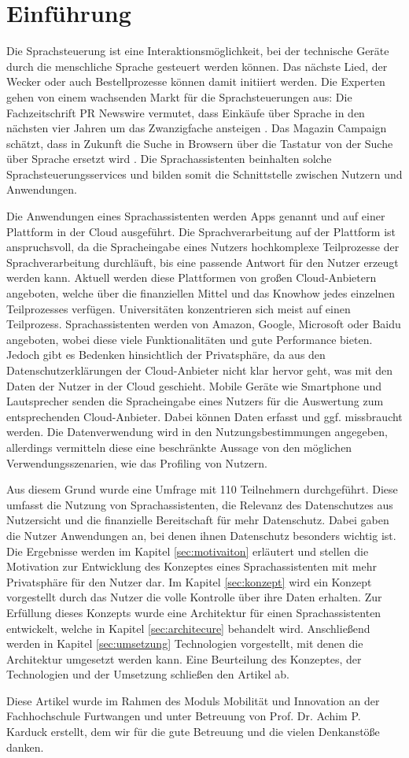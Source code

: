 \section{Einführung}
Die Sprachsteuerung ist eine Interaktionsmöglichkeit, bei der technische Geräte durch die menschliche Sprache gesteuert werden können. Das nächste Lied, der Wecker oder auch Bestellprozesse können damit initiiert werden.  Die Experten gehen von einem wachsenden Markt für die Sprachsteuerungen aus: Die Fachzeitschrift \glqq PR Newswire\grqq{} vermutet, dass Einkäufe über Sprache in den nächsten vier Jahren um das Zwanzigfache ansteigen \cite{prNewswire}. Das Magazin \glqq Campaign\grqq{} schätzt, dass in Zukunft die Suche in Browsern über die Tastatur von der Suche über Sprache ersetzt wird \cite{Campaign}. Die Sprachassistenten beinhalten solche Sprachsteuerungsservices und bilden somit die Schnittstelle zwischen Nutzern und Anwendungen. 

Die Anwendungen eines Sprachassistenten werden Apps genannt und auf einer Plattform in der Cloud ausgeführt. Die Sprachverarbeitung auf der Plattform ist anspruchsvoll, da die Spracheingabe eines Nutzers hochkomplexe Teilprozesse der Sprachverarbeitung durchläuft, bis eine passende Antwort für den Nutzer erzeugt werden kann. Aktuell werden diese Plattformen von großen Cloud-Anbietern angeboten, welche über die finanziellen Mittel und das Knowhow jedes einzelnen Teilprozesses verfügen. Universitäten konzentrieren sich meist auf einen Teilprozess. Sprachassistenten werden von Amazon, Google, Microsoft oder Baidu angeboten, wobei diese viele Funktionalitäten und gute Performance bieten. Jedoch gibt es Bedenken hinsichtlich der Privatsphäre, da aus den Datenschutzerklärungen der Cloud-Anbieter nicht klar hervor geht, was mit den Daten der Nutzer in der Cloud geschieht. Mobile Geräte wie Smartphone und Lautsprecher senden die Spracheingabe eines Nutzers für die Auswertung zum entsprechenden Cloud-Anbieter. Dabei können Daten erfasst und ggf. missbraucht werden. Die Datenverwendung wird in den Nutzungsbestimmungen angegeben, allerdings vermitteln diese eine beschränkte Aussage von den möglichen Verwendungsszenarien, wie das Profiling von Nutzern. 

Aus diesem Grund wurde eine Umfrage mit 110 Teilnehmern durchgeführt. Diese umfasst die Nutzung von Sprachassistenten, die Relevanz des Datenschutzes aus Nutzersicht und  die finanzielle Bereitschaft für mehr Datenschutz. Dabei gaben die Nutzer Anwendungen an, bei denen ihnen Datenschutz besonders wichtig ist. Die Ergebnisse werden im Kapitel \ref{sec:motivaiton} erläutert und stellen die Motivation zur Entwicklung des Konzeptes eines Sprachassistenten mit mehr Privatsphäre für den Nutzer dar. Im Kapitel \ref{sec:konzept} wird ein Konzept vorgestellt durch das Nutzer die volle Kontrolle über ihre Daten erhalten. Zur Erfüllung dieses Konzepts wurde eine Architektur für einen Sprachassistenten entwickelt, welche in Kapitel \ref{sec:architecure} behandelt wird. Anschließend werden in Kapitel \ref{sec:umsetzung} Technologien vorgestellt, mit denen die Architektur umgesetzt werden kann. Eine Beurteilung des Konzeptes, der Technologien und der Umsetzung schließen den Artikel ab. \newline

Diese Artikel wurde im Rahmen des Moduls \glqq Mobilität und Innovation\grqq{} an der Fachhochschule Furtwangen und unter Betreuung von Prof. Dr. Achim P. Karduck erstellt, dem wir für die gute Betreuung und die vielen Denkanstöße danken.
